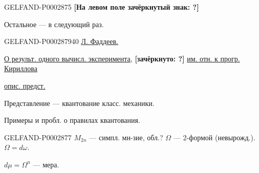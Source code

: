 \begin{GelfandAdjacentEvidence}{GELFAND-P000287}{5}
\textbf{[На левом поле зачёркнутый знак: ?]}

\end{GelfandAdjacentEvidence}


Остальное --- в следующий раз.

\begin{GelfandAdjacentEvidence}{GELFAND-P000287}{940}
\underline{\underline{Л. Фаддеев.}}

\underline{О результ. одного вычисл. эксперимента}, \textbf{[зачёркнуто: ?]} \underline{им. отн. к прогр. Кириллова}

\hfill\underline{опис. предст.}





\end{GelfandAdjacentEvidence}


Представление --- квантование класс. механики.

Примеры и пробл. о правилах квантования.

\begin{GelfandAdjacentEvidence}{GELFAND-P000287}{7}
$M_{2n}$ --- симпл. мн-зие, обл.? $\Omega$ --- 2-формой (невырожд.).\qquad $\Omega=d\omega$.

\end{GelfandAdjacentEvidence}


$d\mu=\Omega^n$ --- мера.

